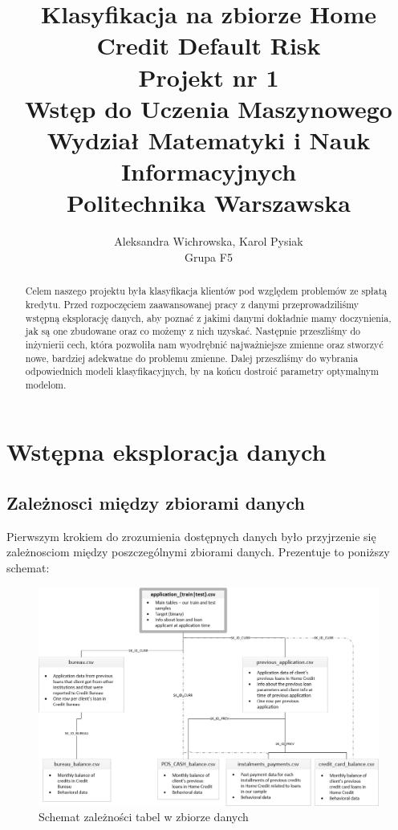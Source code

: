 \documentclass[12pt]{article}
\author{Aleksandra Wichrowska, Karol Pysiak\\
\small Grupa F5}
\title{Klasyfikacja na zbiorze  Home Credit Default Risk\\
	\bigskip
\large Projekt nr 1\\
\bigskip
\large Wstęp do Uczenia Maszynowego\\
Wydział Matematyki i Nauk Informacyjnych\\
Politechnika Warszawska\\
\bigskip}
\begin{document}
	
	\maketitle
\begin{abstract}
Celem naszego projektu była klasyfikacja klientów pod względem problemów ze spłatą kredytu. Przed rozpoczęciem zaawansowanej pracy z danymi przeprowadziliśmy wstępną eksplorację danych, aby poznać z jakimi danymi dokładnie mamy doczynienia, jak są one zbudowane oraz co możemy z nich uzyskać. Następnie przeszliśmy do inżynierii cech, która pozwoliła nam wyodrębnić najważniejsze zmienne oraz stworzyć nowe, bardziej adekwatne do problemu zmienne. Dalej przeszliśmy do wybrania odpowiednich modeli klasyfikacyjnych, by na końcu dostroić parametry optymalnym modelom.
\end{abstract}
	\newpage
	
	\tableofcontents
	
	\newpage


\section{Wstępna eksploracja danych}

\subsection{Zależnosci między zbiorami danych}

Pierwszym krokiem do zrozumienia dostępnych danych było przyjrzenie się zależnosciom między poszczególnymi zbiorami danych. Prezentuje to poniższy schemat:

\begin{figure}[h!]
\centering
\includegraphics[scale=0.5]{zbiory.png}
\caption{Schemat zależności tabel w zbiorze danych}
\end{figure}
\end{document}
